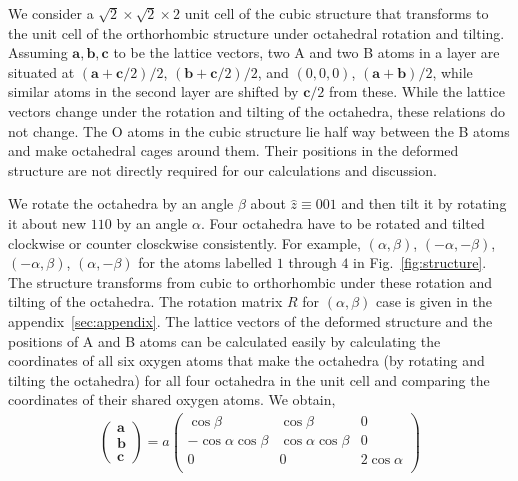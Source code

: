 \documentclass[a4paper,prb,twocolumn]{revtex4-1}  %
\newcommand{\az}[1]{{\color{magenta}{#1}}} %
\begin{document}
We consider a
$\sqrt{2}\times\sqrt{2}\times 2$ unit cell of the cubic structure that transforms
to the unit cell of the orthorhombic structure under octahedral rotation and tilting.
Assuming 
$\textbf{a},\textbf{b},\textbf{c}$
 to be the lattice vectors,
two A and two B atoms in a layer are situated at
$(\textbf{a} + \textbf{c}/2)/2$, $(\textbf{b}+ \textbf{c}/2)/2$,
and $(0,0,0)$, 
$(\textbf{a}  + \textbf{b} )/2$, 
while similar atoms in the second layer are shifted by 
$\textbf{c} /2$
 from these.
While the lattice vectors change under the rotation and tilting of the octahedra, 
these relations do not change.
The O atoms in the cubic structure lie half way between the B atoms and make octahedral cages around them.
Their positions in the deformed structure %
are not directly required for our calculations and discussion.


We rotate the octahedra by an angle $\beta$ about $\hat z \equiv 001$
and then tilt it by rotating it about new $110$ by an angle $\alpha$.
Four octahedra have to be rotated and tilted clockwise or counter closckwise
consistently. For example, %
$(\alpha,\beta)$,
$(-\alpha,-\beta)$,
$(-\alpha,\beta)$,
$(\alpha,-\beta)$
for the atoms labelled $1$ through $4$ in Fig.~\ref{fig:structure}.
The structure transforms from cubic to orthorhombic under these rotation and tilting of the octahedra.
The rotation matrix $R$ for $(\alpha,\beta)$ case is given in the appendix~\ref{sec:appendix}. 
The lattice vectors of the deformed structure and the positions of A and B atoms can be calculated easily by calculating the coordinates of all six oxygen atoms that make the octahedra (by rotating and tilting the octahedra) for all four octahedra in the unit cell and 
comparing the coordinates of their shared oxygen atoms.
We obtain,
\begin{align}
\left(
\begin{array}{c}
\textbf{a}\\
\textbf{b}\\
\textbf{c}
\end{array}
\right)
= a
\left(
\begin{array}{ccc}
 \cos \beta  & \cos \beta  & 0 \\
 -\cos \alpha  \cos \beta  & \cos \alpha  \cos \beta  & 0 \\
 0 & 0 & 2 \cos \alpha  \\
\end{array}
\right)
\end{align}
\end{document}
